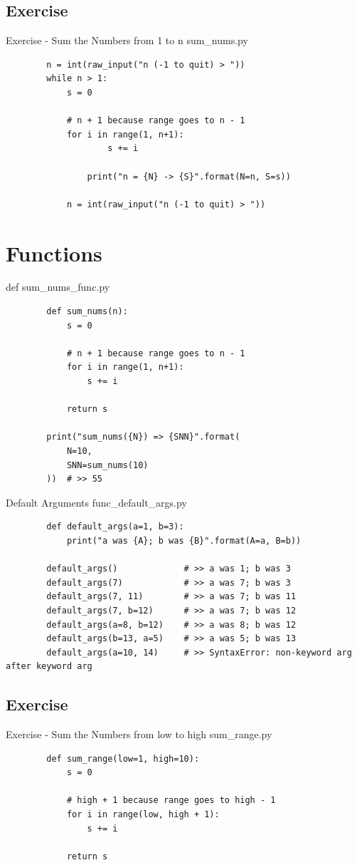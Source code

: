\documentclass[11pt]{beamer}
\begin{document}
\subsection{Exercise}
\begin{frame}[fragile]{Exercise - Sum the Numbers from 1 to n}
	sum\_nums.py	
	\pause
	\begin{lstlisting}
		n = int(raw_input("n (-1 to quit) > "))
		while n > 1:
		    s = 0		 
		    
		    # n + 1 because range goes to n - 1   
		    for i in range(1, n+1):
		    	    s += i
		    	
		    	print("n = {N} -> {S}".format(N=n, S=s))
		    
		    n = int(raw_input("n (-1 to quit) > "))
	\end{lstlisting}
\end{frame}

\section{Functions}
\begin{frame}[fragile]{def}
	sum\_nums\_func.py
	\begin{lstlisting}
		def sum_nums(n):
		    s = 0
		    
		    # n + 1 because range goes to n - 1
		    for i in range(1, n+1):
		        s += i
			
		    return s
		
		print("sum_nums({N}) => {SNN}".format(
		    N=10, 
		    SNN=sum_nums(10)
		))  # >> 55
	\end{lstlisting}
\end{frame}

\begin{frame}[fragile]{Default Arguments}
	func\_default\_args.py
	\begin{lstlisting}
		def default_args(a=1, b=3):
		    print("a was {A}; b was {B}".format(A=a, B=b))
		
		default_args()             # >> a was 1; b was 3
		default_args(7)            # >> a was 7; b was 3
		default_args(7, 11)        # >> a was 7; b was 11
		default_args(7, b=12)      # >> a was 7; b was 12
		default_args(a=8, b=12)    # >> a was 8; b was 12
		default_args(b=13, a=5)    # >> a was 5; b was 13
		default_args(a=10, 14)     # >> SyntaxError: non-keyword arg after keyword arg
	\end{lstlisting}
\end{frame}

\subsection{Exercise}
\begin{frame}[fragile]{Exercise - Sum the Numbers from low to high}
	sum\_range.py
	\pause
	\begin{lstlisting}
		def sum_range(low=1, high=10):
		    s = 0
		    
		    # high + 1 because range goes to high - 1
		    for i in range(low, high + 1):
		        s += i
			
		    return s
	\end{lstlisting}
\end{frame}
\end{document}
